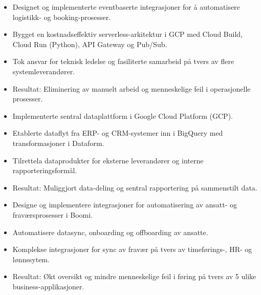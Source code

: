 {    %
    \begin{itemize}
        \item Designet og implementerte eventbaserte integrasjoner for å automatisere logistikk- og booking-prosesser.
        \item Bygget en kostnadseffektiv serverless-arkitektur i GCP med Cloud Build, Cloud Run (Python), API Gateway og Pub/Sub.
        \item Tok ansvar for teknisk ledelse og fasiliterte samarbeid på tvers av flere systemleverandører.
        \item Resultat: Eliminering av manuelt arbeid og menneskelige feil i operasjonelle prosesser.
    \end{itemize}

    \begin{itemize}
        \item Implementerte sentral dataplattform i Google Cloud Platform (GCP).
        \item Etablerte dataflyt fra ERP- og CRM-systemer inn i BigQuery med transformasjoner i Dataform.
        \item Tilrettela dataprodukter for eksterne leverandører og interne rapporteringsformål.
        \item Resultat: Muliggjort data-deling og sentral rapportering på sammenstilt data.
    \end{itemize}

    \begin{itemize}
        \item Designe og implementere integrasjoner for automatisering av ansatt- og fraværsprosesser i Boomi.
        \item Automatisere datasync, onboarding og offboarding av ansatte.
        \item Komplekse integrasjoner for sync av fravær på tvers av timeførings-, HR- og lønnssytem.
        \item Resultat: Økt oversikt og mindre menneskelige feil i føring på tvers av 5 ulike business-applikasjoner.
    \end{itemize}
}
